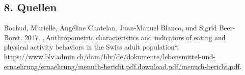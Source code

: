 \documentclass[12pt,ngerman,]{article}
\begin{document}
\hypertarget{quellen}{%
\subsection*{8. Quellen}\label{quellen}}

\hypertarget{refs}{}
\leavevmode\hypertarget{ref-bochud_anthropometric_2017}{}%
Bochud, Murielle, Angéline Chatelan, Juan-Manuel Blanco, und Sigrid
Beer-Borst. 2017. „Anthropometric characteristics and indicators of
eating and physical activity behaviors in the Swiss adult population``.
\url{https://www.blv.admin.ch/dam/blv/de/dokumente/lebensmittel-und-ernaehrung/ernaehrung/menuch-bericht.pdf.download.pdf/menuch-bericht.pdf}.
\end{document}
